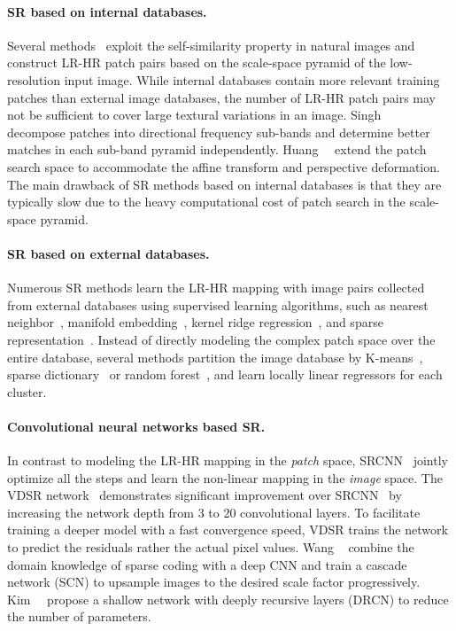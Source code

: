 \documentclass[10pt,twocolumn,letterpaper]{article}
\begin{document}
	\noindent\paragraph{SR based on internal databases.}
	Several methods~\cite{Freedman-TOG-2011,Glasner-ICCV-2009} exploit the self-similarity property in natural images and construct LR-HR patch pairs based on the scale-space pyramid of the low-resolution input image.
	While internal databases contain more relevant training patches than external image databases, 
	the number of LR-HR patch pairs may not be sufficient to cover large textural variations in an image.
	Singh~\etal~\cite{Singh-ACCV-2014} decompose patches into directional frequency sub-bands and determine better matches in each sub-band pyramid independently.
	Huang~\etal~\cite{Huang-CVPR-2015} extend the patch search space to accommodate the affine transform and perspective deformation.
	The main drawback of SR methods based on internal databases is that they are typically slow due to the heavy computational cost of patch search in the scale-space pyramid.
	
	\paragraph{SR based on external databases.}
	Numerous SR methods learn the LR-HR mapping with image pairs collected from external databases using supervised learning algorithms, such as nearest neighbor~\cite{Freeman-CGA-2002}, manifold embedding~\cite{Bevilacqua-BMVC-2012,Chang-CVPR-2004}, kernel ridge regression~\cite{Kim-PAMI-2010}, and sparse representation~\cite{Yang-CVPR-2008,Yang-TIP-2010,Zeyde-2010}.
	Instead of directly modeling the complex patch space over the entire database, several methods partition the image database by K-means~\cite{Yang-ICCV-2013}, sparse dictionary~\cite{A+} or random forest~\cite{RFL}, and learn locally linear regressors for each cluster.
	
	
	\noindent\paragraph{Convolutional neural networks based SR.} 
	In contrast to modeling the LR-HR mapping in the \emph{patch} space, SRCNN~\cite{SRCNN} jointly optimize all the steps and learn the non-linear mapping in the \emph{image} space.
	The VDSR network~\cite{VDSR} demonstrates significant improvement over SRCNN~\cite{SRCNN} by increasing the network depth from 3 to 20 convolutional layers.
	To facilitate training a deeper model with a fast convergence speed, VDSR trains the network to predict the residuals rather the actual pixel values.
	Wang \etal~\cite{SCN} combine the domain knowledge of sparse coding with a deep CNN and train a cascade network (SCN) to upsample images to the desired scale factor progressively.
	Kim~\etal~\cite{DRCN} propose a shallow network with deeply recursive layers (DRCN) to reduce the number of parameters.
	
\end{document}
